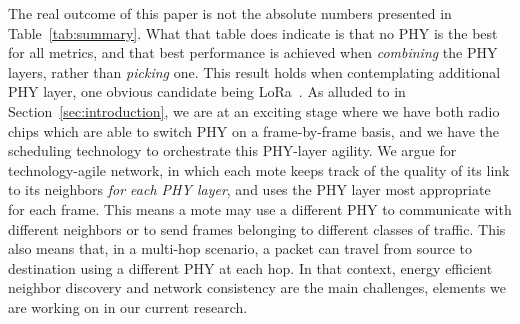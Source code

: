 \documentclass[sensors,article,submit,moreauthors,pdftex]{Definitions/mdpi}
\begin{document}

The real outcome of this paper is not the absolute numbers presented in Table~\ref{tab:summary}.
What that table does indicate is that no PHY is the best for all metrics,
    and that best performance is achieved when \textit{combining} the PHY layers, rather than \textit{picking} one.
This result holds when contemplating additional PHY layer,
    one obvious candidate being LoRa~\cite{adelantado17understanding}.
As alluded to in Section~\ref{sec:introduction}, we are at an exciting stage where we have both radio chips which are able to switch PHY on a frame-by-frame basis, and we have the scheduling technology to orchestrate this PHY-layer agility.
We argue for technology-agile network, in which each mote keeps track of the quality of its link to its neighbors \textit{for each PHY layer}, and uses the PHY layer most appropriate for each frame.
This means a mote may use a different PHY to communicate with different neighbors or to send frames belonging to different classes of traffic. 
This also means that, in a multi-hop scenario, a packet can travel from source to destination using a different PHY at each hop.
In that context, energy efficient neighbor discovery and network consistency are the main challenges, elements we are working on in our current research.



\end{document}
